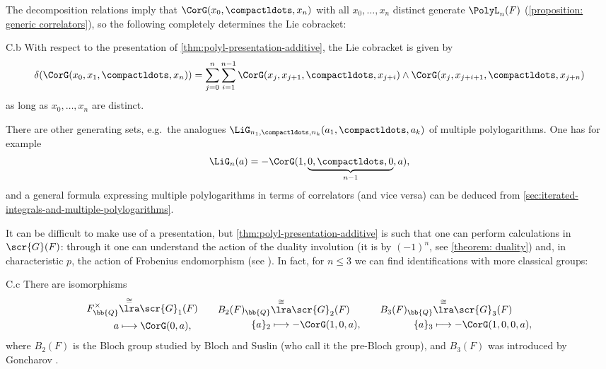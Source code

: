 \documentclass[a4paper]{amsart}
\begin{document}
The decomposition relations imply that $\CorG(x_0,\compactldots,x_n)$ with all $x_0,\ldots,x_n$ distinct generate $\PolyL_n(F)$ (\cref{proposition: generic correlators}), so the following completely determines the Lie cobracket:

\begin{customthm}{C.b}\label{thm:polyl-presentation-cobracket} With respect to the presentation of \cref{thm:polyl-presentation-additive},
the Lie cobracket is given by
\[\delta(\CorG(x_0,x_1,\compactldots,x_n)) = \sum_{j=0}^n \sum_{i=1}^{n-1} \CorG(x_j,x_{j+1},\compactldots,x_{j+i}) \wedge \CorG(x_j,x_{j+i+1},\compactldots,x_{j+n})\]
as long as $x_0,\ldots,x_n$ are distinct.
\end{customthm}

There are other generating sets, e.g.~the analogues $\LiG_{n_1,\compactldots,n_k}(a_1,\compactldots,a_k)$ of multiple polylogarithms. One has for example
\[\LiG_n(a)=-\CorG(1,\underbrace{0,\compactldots,0}_{n-1},a),\]
and a general formula expressing multiple polylogarithms in terms of correlators (and vice versa) can be deduced from \cref{sec:iterated-integrals-and-multiple-polylogarithms}.

It can be difficult to make use of a presentation, but \cref{thm:polyl-presentation-additive} is such that one can perform calculations in $\scr{G}(F)$: through it one can understand the action of the duality involution (it is by $(-1)^n$, see \cref{theorem: duality}) and, in characteristic $p$, the action of Frobenius endomorphism (see \cite{KRS2}). In fact, for $n \leq 3$ we can find identifications with more classical groups:

\begin{customthm}{C.c}
\label{thm:polyl-identification} There are isomorphisms
\[\begin{aligned}F^\times_\bb{Q} &\overset{\cong}\lra \scr{G}_1(F) \\
a &\longmapsto \CorG(0,a),\end{aligned} \qquad \begin{aligned}B_2(F)_\bb{Q} &\overset{\cong}\lra \scr{G}_2(F) \\
\{a\}_2 &\longmapsto -\CorG(1,0,a),\end{aligned} \qquad\begin{aligned}B_3(F)_\bb{Q} &\overset{\cong}\lra \scr{G}_3(F) \\
\{a\}_3 &\longmapsto -\CorG(1,0,0,a),\end{aligned}\]
where $B_2(F)$ is the Bloch group studied by Bloch and Suslin \cite{Bloch,Sus90} (who call it the pre-Bloch group), and $B_3(F)$ was introduced by Goncharov \cite{Gon95b}.
\end{customthm}
\end{document}
